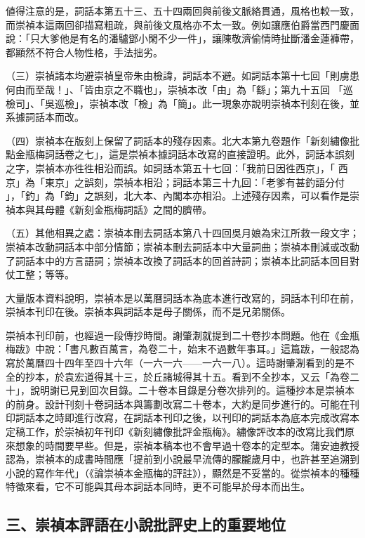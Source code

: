 値得注意的是，詞話本第五十三、五十四兩回與前後文脈絡貫通，風格也較一致，而崇禎本這兩回卻描寫粗疏，與前後文風格亦不太一致。例如讓應伯爵當西門慶面說：「只大爹他是有名的潘驢鄧小閑不少一件」，讓陳敬濟偷情時扯斷潘金蓮褲帶，都顯然不符合人物性格，手法拙劣。

（三）崇禎諸本均避崇禎皇帝朱由檢諱，詞話本不避。如詞話本第十七回「則虜患何由而至哉！」、「皆由京之不職也」，崇禎本改「由」為「繇」；第九十五回 「巡檢司」、「吳巡檢」，崇禎本改「檢」為「簡」。此一現象亦說明崇禎本刊刻在後，並系據詞話本而改。

（四）崇禎本在版刻上保留了詞話本的殘存因素。北大本第九卷題作「新刻繡像批點金瓶梅詞話卷之七」，這是崇禎本據詞話本改寫的直接證明。此外，詞話本誤刻之字，崇禎本亦徃徃相沿而誤。如詞話本第五十七回：「我前日因徃西京」，「 西京」為「東京」之誤刻，崇禎本相沿；詞話本第三十九回：「老爹有甚釣語分付 」，「釣」為「鈞」之誤刻，北大本、內閣本亦相沿。上述殘存因素，可以看作是崇禎本與其母體《新刻金瓶梅詞話》之間的臍帶。

（五）其他相異之處：崇禎本刪去詞話本第八十四回吳月娘為宋江所救一段文字；崇禎本改動詞話本中部分情節；崇禎本刪去詞話本中大量詞曲；崇禎本刪減或改動了詞話本中的方言語詞；崇禎本改換了詞話本的回首詩詞；崇禎本比詞話本回目對仗工整；等等。

大量版本資料說明，崇禎本是以萬曆詞話本為底本進行改寫的，詞話本刊印在前，崇禎本刊印在後。崇禎本與詞話本是母子關係，而不是兄弟關係。

崇禎本刊印前，也經過一段傳抄時間。謝肇淛就提到二十卷抄本問題。他在《金瓶梅跋》中說：「書凡數百萬言，為卷二十，始末不過數年事耳。」這篇跋，一般認為寫於萬曆四十四年至四十六年（一六一六——一六一八）。這時謝肇淛看到的是不全的抄本，於袁宏道得其十三，於丘諸城得其十五。看到不全抄本，又云「為卷二十」，說明謝已見到回次目錄。二十卷本目錄是分卷次排列的。這種抄本是崇禎本的前身。設計刊刻十卷詞話本與籌劃改寫二十卷本，大約是同步進行的。可能在刊印詞話本之時即進行改寫，在詞話本刊印之後，以刊印的詞話本為底本完成改寫本定稿工作，於崇禎初年刊印《新刻繡像批評金瓶梅》。繡像評改本的改寫比我們原來想象的時間要早些。但是，崇禎本稿本也不會早過十卷本的定型本。蒲安迪教授認為，崇禎本的成書時間應「提前到小說最早流傳的朦朧歲月中，也許甚至追溯到小說的寫作年代」（《論崇禎本金瓶梅的評註》），顯然是不妥當的。從崇禎本的種種特徵來看，它不可能與其母本詞話本同時，更不可能早於母本而出生。

\subsection*{三、崇禎本評語在小說批評史上的重要地位}

